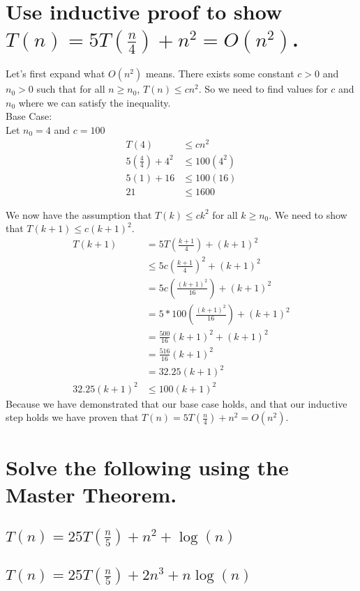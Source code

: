 \documentclass{article}
\begin{document}
\section{Use inductive proof to show \(T(n) = 5T(\frac{n}{4}) + n^2 = O(n^2)\).}
Let's first expand what \(O(n^2)\) means.
There exists some constant \(c > 0\) and \(n_0 > 0\) such that for all \(n \geq n_0\), \(T(n) \leq cn^2\).
So we need to find values for \(c\) and \(n_0\) where we can satisfy the inequality. \\
Base Case: \\
Let \(n_0 = 4\) and \(c = 100\)
\begin{align*}
    T(4) & \leq cn^2 \\
    5(\frac{4}{4}) + 4^2 &\leq 100(4^2) \\
    5(1) + 16 &\leq 100(16)\\
    21 &\leq 1600 
\end{align*}

We now have the assumption that \(T(k) \leq ck^2\) for all \(k \geq n_0\).
We need to show that \(T(k+1) \leq c(k+1)^2\).
\begin{align*}
    T(k+1) &= 5T(\frac{k+1}{4}) + (k+1)^2 \\
           &\leq 5c(\frac{k+1}{4})^2 + (k+1)^2 \\
              &= 5c(\frac{(k+1)^2}{16}) + (k+1)^2 \\
              &= 5*100(\frac{(k+1)^2}{16}) + (k+1)^2 \\
              &= \frac{500}{16}(k+1)^2 + (k+1)^2 \\
              &= \frac{516}{16}(k+1)^2 \\
              &= 32.25(k+1)^2 \\
            32.25(k+1)^2 &\leq 100(k+1)^2
\end{align*}
Because we have demonstrated that our base case holds, and that our inductive step holds
we have proven that \(T(n) = 5T(\frac{n}{4}) + n^2 = O(n^2)\).

\section{Solve the following using the Master Theorem.}
    \subsection{\(T(n) = 25T(\frac{n}{5}) + n^2 + \log(n)\)}
    \subsection{\(T(n) = 25T(\frac{n}{5}) + 2n^3 + n \log(n)\)}
\end{document}
